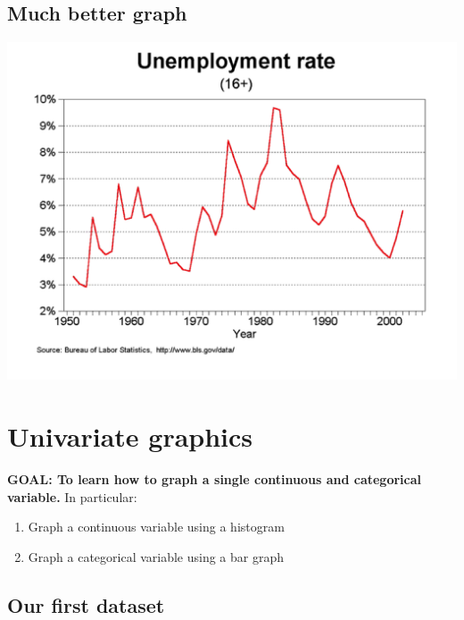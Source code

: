 \documentclass[
]{book}
\providecommand{\tightlist}{%
  \setlength{\itemsep}{0pt}\setlength{\parskip}{0pt}}
\begin{document}
\hypertarget{much-better-graph}{%
\subsection{Much better graph}\label{much-better-graph}}

\includegraphics{Stata/StataGraph/images/Good.png}

\hypertarget{univariate-graphics}{%
\section{Univariate graphics}\label{univariate-graphics}}

\begin{alert}

\textbf{GOAL: To learn how to graph a single continuous and categorical variable.} In particular:

\begin{enumerate}
\def\labelenumi{\arabic{enumi}.}
\tightlist
\item
  Graph a continuous variable using a histogram
\item
  Graph a categorical variable using a bar graph
\end{enumerate}

\end{alert}

\hypertarget{our-first-dataset}{%
\subsection{Our first dataset}\label{our-first-dataset}}
\end{document}
